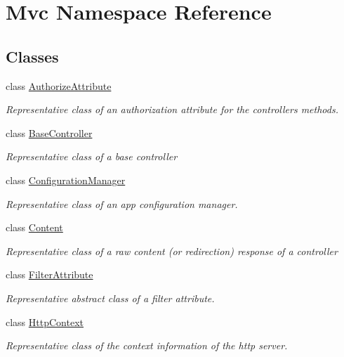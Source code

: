 \hypertarget{namespace_mvc}{}\section{Mvc Namespace Reference}
\label{namespace_mvc}
\subsection*{Classes}
\begin{DoxyCompactItemize}
\item 
class \hyperlink{class_mvc_1_1_authorize_attribute}{Authorize\+Attribute}
\begin{DoxyCompactList}\small\item\em Representative class of an authorization attribute for the controllers methods. \end{DoxyCompactList}\item 
class \hyperlink{class_mvc_1_1_base_controller}{Base\+Controller}
\begin{DoxyCompactList}\small\item\em Representative class of a base controller \end{DoxyCompactList}\item 
class \hyperlink{class_mvc_1_1_configuration_manager}{Configuration\+Manager}
\begin{DoxyCompactList}\small\item\em Representative class of an app configuration manager. \end{DoxyCompactList}\item 
class \hyperlink{class_mvc_1_1_content}{Content}
\begin{DoxyCompactList}\small\item\em Representative class of a raw content (or redirection) response of a controller \end{DoxyCompactList}\item 
class \hyperlink{class_mvc_1_1_filter_attribute}{Filter\+Attribute}
\begin{DoxyCompactList}\small\item\em Representative abstract class of a filter attribute. \end{DoxyCompactList}\item 
class \hyperlink{class_mvc_1_1_http_context}{Http\+Context}
\begin{DoxyCompactList}\small\item\em Representative class of the context information of the http server. \end{DoxyCompactList}\item 

\end{DoxyCompactItemize}
